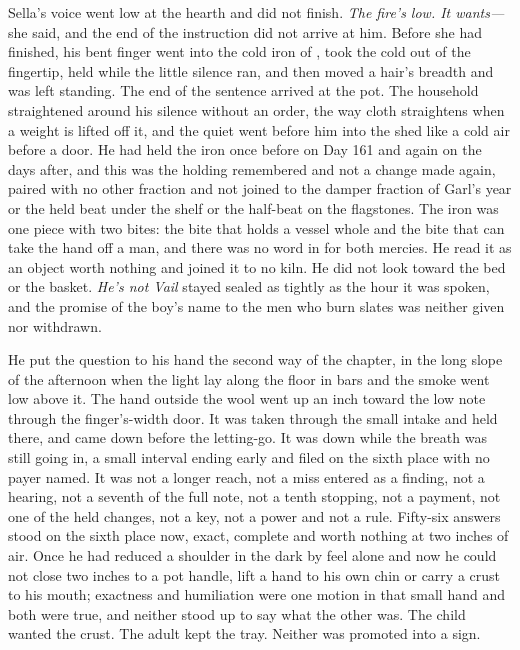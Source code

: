 Sella's voice went low at the hearth and did not finish. \emph{The fire's low. It wants---} she said, and the end of the instruction did not arrive at him. Before she had finished, his bent finger went into the cold iron of , took the cold out of the fingertip, held while the little silence ran, and then moved a hair's breadth and was left standing. The end of the sentence arrived at the pot. The household straightened around his silence without an order, the way cloth straightens when a weight is lifted off it, and the quiet went before him into the shed like a cold air before a door. He had held the iron once before on Day 161 and again on the days after, and this was the holding remembered and not a change made again, paired with no other fraction and not joined to the damper fraction of Garl's year or the held beat under the shelf or the half-beat on the flagstones. The iron was one piece with two bites: the bite that holds a vessel whole and the bite that can take the hand off a man, and there was no word in  for both mercies. He read it as an object worth nothing and joined it to no kiln. He did not look toward the bed or the basket. \emph{He's not Vail} stayed sealed as tightly as the hour it was spoken, and the promise of the boy's name to the men who burn slates was neither given nor withdrawn.

\scenebreak

He put the question to his hand the second way of the chapter, in the long slope of the afternoon when the light lay along the floor in bars and the smoke went low above it. The hand outside the wool went up an inch toward the low note through the finger's-width door. It was taken through the small intake and held there, and came down before the letting-go. It was down while the breath was still going in, a small interval ending early and filed on the sixth place with no payer named. It was not a longer reach, not a miss entered as a finding, not a hearing, not a seventh of the full note, not a tenth stopping, not a payment, not one of the held changes, not a key, not a power and not a rule. Fifty-six answers stood on the sixth place now, exact, complete and worth nothing at two inches of air. Once he had reduced a shoulder in the dark by feel alone and now he could not close two inches to a pot handle, lift a hand to his own chin or carry a crust to his mouth; exactness and humiliation were one motion in that small hand and both were true, and neither stood up to say what the other was. The child wanted the crust. The adult kept the tray. Neither was promoted into a sign.

